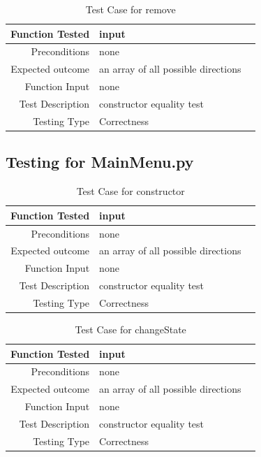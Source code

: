 \documentclass[12pt]{article}
\begin{document}
\begin{center}
	\begin{longtable}{ | r | p{4cm} | p{4cm} }
	\caption{Test Case for remove} \\ \hline \label{TblInputVar} 
	Function Tested & input\\ \hline
	Preconditions & none \\ \hline
	Expected outcome & an array of all possible directions \\ \hline
	Function Input & none \\ \hline
	Test Description & constructor equality test\\ \hline
	Testing Type & Correctness\\ \hline
	
	\end{longtable}
\end{center}

\subsection{Testing for MainMenu.py}
\begin{center}
	\begin{longtable}{ | r | p{4cm} | p{4cm} }
	\caption{Test Case for constructor} \\ \hline \label{TblInputVar} 
	Function Tested & input\\ \hline
	Preconditions & none \\ \hline
	Expected outcome & an array of all possible directions \\ \hline
	Function Input & none \\ \hline
	Test Description & constructor equality test\\ \hline
	Testing Type & Correctness\\ \hline
	
	\end{longtable}
\end{center}

\begin{center}
	\begin{longtable}{ | r | p{4cm} | p{4cm} }
	\caption{Test Case for changeState} \\ \hline \label{TblInputVar} 
	Function Tested & input\\ \hline
	Preconditions & none \\ \hline
	Expected outcome & an array of all possible directions \\ \hline
	Function Input & none \\ \hline
	Test Description & constructor equality test\\ \hline
	Testing Type & Correctness\\ \hline
	
	\end{longtable}
\end{center}
\end{document}
